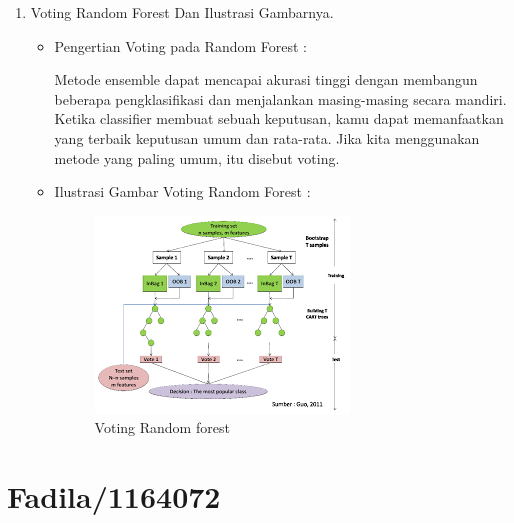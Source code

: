 \begin{enumerate}
\par
\par
\item Voting Random Forest Dan Ilustrasi Gambarnya.
\par
\begin{itemize}
\item Pengertian Voting pada Random Forest	:
\par Metode ensemble dapat mencapai akurasi tinggi dengan membangun beberapa pengklasifikasi dan menjalankan
masing-masing secara mandiri. Ketika classifier membuat sebuah keputusan, kamu dapat memanfaatkan yang terbaik
keputusan umum dan rata-rata. Jika kita menggunakan metode yang paling umum, itu disebut voting.
\item Ilustrasi Gambar Voting Random Forest :
\begin{figure}[ht]
\centering
\includegraphics[scale=1]{figures/aku2.png}
\caption{Voting Random forest}
\label{contoh}
\end{figure}
\end{itemize}
\end{enumerate}


\section{Fadila/1164072}
